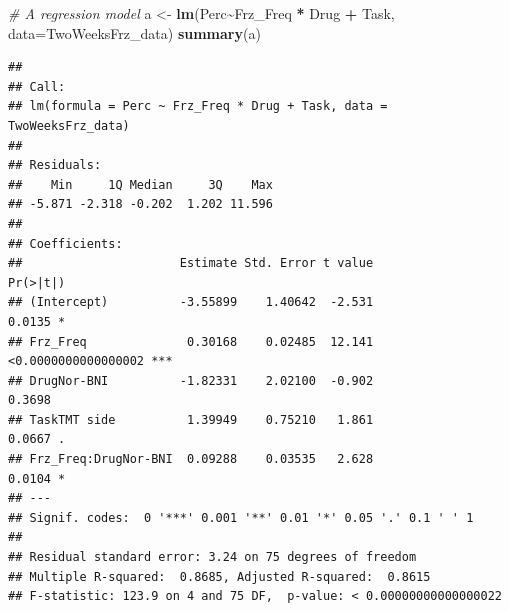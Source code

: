 \documentclass[
]{book}
\newenvironment{Shaded}{\begin{snugshade}}{\end{snugshade}}
\newcommand{\AttributeTok}[1]{\textcolor[rgb]{0.13,0.29,0.53}{#1}}
\newcommand{\CommentTok}[1]{\textcolor[rgb]{0.56,0.35,0.01}{\textit{#1}}}
\newcommand{\FunctionTok}[1]{\textcolor[rgb]{0.13,0.29,0.53}{\textbf{#1}}}
\newcommand{\NormalTok}[1]{#1}
\newcommand{\OtherTok}[1]{\textcolor[rgb]{0.56,0.35,0.01}{#1}}
\newcommand{\SpecialCharTok}[1]{\textcolor[rgb]{0.81,0.36,0.00}{\textbf{#1}}}
\newcommand{\StringTok}[1]{\textcolor[rgb]{0.31,0.60,0.02}{#1}}
\begin{document}
\begin{Shaded}
\begin{Highlighting}[]
\CommentTok{\# A regression model}
\NormalTok{a }\OtherTok{\textless{}{-}} \FunctionTok{lm}\NormalTok{(Perc}\SpecialCharTok{\textasciitilde{}}\NormalTok{Frz\_Freq }\SpecialCharTok{*}\NormalTok{ Drug }\SpecialCharTok{+}\NormalTok{ Task, }\AttributeTok{data=}\NormalTok{TwoWeeksFrz\_data)}
\FunctionTok{summary}\NormalTok{(a)}
\end{Highlighting}
\end{Shaded}

\begin{verbatim}
## 
## Call:
## lm(formula = Perc ~ Frz_Freq * Drug + Task, data = TwoWeeksFrz_data)
## 
## Residuals:
##    Min     1Q Median     3Q    Max 
## -5.871 -2.318 -0.202  1.202 11.596 
## 
## Coefficients:
##                      Estimate Std. Error t value            Pr(>|t|)    
## (Intercept)          -3.55899    1.40642  -2.531              0.0135 *  
## Frz_Freq              0.30168    0.02485  12.141 <0.0000000000000002 ***
## DrugNor-BNI          -1.82331    2.02100  -0.902              0.3698    
## TaskTMT side          1.39949    0.75210   1.861              0.0667 .  
## Frz_Freq:DrugNor-BNI  0.09288    0.03535   2.628              0.0104 *  
## ---
## Signif. codes:  0 '***' 0.001 '**' 0.01 '*' 0.05 '.' 0.1 ' ' 1
## 
## Residual standard error: 3.24 on 75 degrees of freedom
## Multiple R-squared:  0.8685, Adjusted R-squared:  0.8615 
## F-statistic: 123.9 on 4 and 75 DF,  p-value: < 0.00000000000000022
\end{verbatim}

\begin{Shaded}
\end{Shaded}
\end{document}

